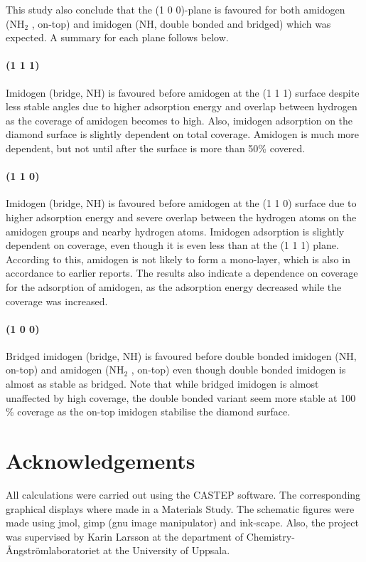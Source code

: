 \documentclass[12pt,a4paper]{article}
\begin{document}
 This study also conclude that the (1 0 0)-plane is favoured for both amidogen (NH$_2$ , on-top) and imidogen (NH, double bonded and bridged) which was expected. A summary for each plane follows below.

\paragraph*{(1 1 1)} Imidogen (bridge, NH) is favoured before amidogen at the (1 1 1) surface despite less stable angles due to higher adsorption energy and overlap between hydrogen as the coverage of amidogen becomes to high. Also, imidogen adsorption on the diamond surface is slightly dependent on total coverage. Amidogen is much more dependent, but not until after the surface is more than 50\% covered. 
\paragraph*{(1 1 0)} Imidogen (bridge, NH) is favoured before amidogen at the (1 1 0) surface due to higher adsorption energy and severe overlap between the hydrogen atoms on the amidogen groups and nearby hydrogen atoms. Imidogen adsorption is slightly dependent on coverage, even though it is even less than at the (1 1 1) plane. According to this, amidogen is not likely to form a mono-layer, which is also in accordance to earlier reports. The results also indicate a dependence on coverage for the adsorption of amidogen, as the adsorption energy decreased while the coverage was increased. 
\paragraph*{(1 0 0)} Bridged imidogen (bridge, NH) is favoured before double bonded imidogen (NH, on-top) and amidogen (NH$_2$ , on-top) even though double bonded imidogen is almost as stable as bridged. Note that while bridged imidogen is almost unaffected by high coverage, the double bonded variant seem more stable at 100 \% coverage as the on-top imidogen stabilise the diamond surface.



\section*{Acknowledgements}
All calculations were carried out using the CASTEP software. The corresponding graphical displays where made in a Materials Study. The schematic figures were made using jmol, gimp (gnu image manipulator) and ink-scape.  Also, the project was supervised by Karin Larsson at the department of Chemistry-Ångströmlaboratoriet at the University of Uppsala.
\end{document}
